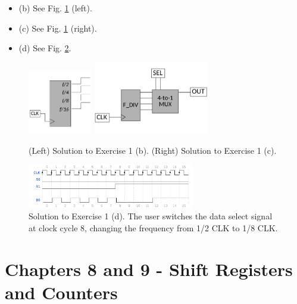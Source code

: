 \documentclass[10pt]{article}
\begin{document}
\begin{enumerate}
\begin{itemize}
\item (b) See Fig. \ref{fig:twoDFF2} (left).
\item (c) See Fig. \ref{fig:twoDFF2} (right).
\item (d) See Fig. \ref{fig:twoDFF3}.
\end{itemize}
\begin{figure}[ht]
\centering
\includegraphics[width=0.25\textwidth]{figures/design8.pdf}
\includegraphics[width=0.45\textwidth]{figures/design9.pdf}
\caption{\label{fig:twoDFF2} (Left) Solution to Exercise 1 (b).  (Right) Solution to Exercise 1 (c).}
\end{figure}
\begin{figure}[hb]
\centering
\includegraphics[width=0.65\textwidth]{figures/timingExample18.pdf}
\caption{\label{fig:twoDFF3} Solution to Exercise 1 (d).  The user switches the data select signal at clock cycle 8, changing the frequency from 1/2 CLK to 1/8 CLK.}
\end{figure}
\end{enumerate}

\clearpage

\section{Chapters 8 and 9 - Shift Registers and Counters}
\end{document}
